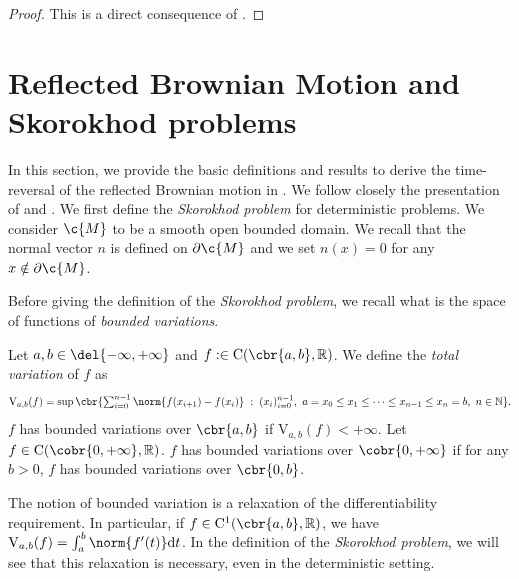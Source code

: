 \begin{proof}
	This is a direct consequence of \cite[Theorem 2.3.3]{nualart2006malliavin}.
\end{proof}

\section{Reflected Brownian Motion and Skorokhod problems}
\label{sec:refl-brown-moti}

In this section, we provide the basic definitions and results to derive the time-reversal of the reflected Brownian motion in .
We follow closely the presentation of \cite{lions1984stochastic} and \cite{burdzy2004heat}.
We first define the \emph{Skorokhod problem} for deterministic problems.
We consider $\c{M}$ to be a smooth open bounded domain.
We recall that the normal vector $n$ is defined on $\partial \c{M}$ and we set $n(x) = 0$ for any $x \notin \partial \c{M}$.

Before giving the definition of the \emph{Skorokhod problem}, we recall what is the space of functions of \emph{bounded variations}.

\begin{definition}
	Let $a, b \in \del{-\infty, +\infty}$ and $f: \in \mathrm{C}(\cbr{a,b}, \R)$.
	We define the \emph{total variation} of $f$ as \begin{equation} \textstyle \mathrm{V}_{a,b}(f) = \sup \cbr{\sum_{i=0}^{n-1} \norm{f(x_{i+1}) - f(x_i)} \; : \; (x_i)_{i=0}^{n-1}, \ a=x_0 \leq x_1 \leq \dots \leq x_{n-1} \leq x_n = b, \ n \in \N} .
	\end{equation}
	$f$ has bounded variations over $\cbr{a,b}$ if
	$\mathrm{V}_{a,b}(f) < +\infty$.
	Let $f \in \mathrm{C}(\cobr{0,+\infty}, \R)$.
	$f$ has bounded variations over $\cobr{0,+\infty}$ if for any
	$b>0$, $f$ has bounded variations over $\cbr{0,b}$.
\end{definition}

The notion of bounded variation is a relaxation of the differentiability requirement.
In particular, if $f \in \mathrm{C}^1(\cbr{a,b}, \R)$, we have $\mathrm{V}_{a,b}(f) = \int_a^b \norm{f'(t)} \mathrm{d} t$.
In the definition of the \emph{Skorokhod problem}, we will see that this relaxation is necessary, even in the deterministic setting.

